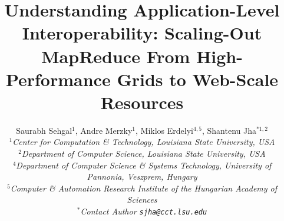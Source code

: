 \documentclass[3p,twocolumn]{elsarticle}
\begin{document}
\title{Understanding Application-Level Interoperability: Scaling-Out
  MapReduce From High-Performance Grids to Web-Scale Resources}

     \author{Saurabh Sehgal$^1$, Andre Merzky$^{1}$, Miklos
       Erdelyi$^{4,5}$, Shantenu Jha$^{*1,2}$
       \\
       \small{\emph{$^{1}$Center for Computation \& Technology, Louisiana State University, USA}}\\
       \small{\emph{$^{2}$Department of Computer Science, Louisiana State University, USA}}\\
       \small{\emph{$^{4}$Department of Computer Science \& Systems
           Technology, University of
           Pannonia, Veszprem, Hungary}}\\
       \small{\emph{$^{5}$Computer \& Automation Research Institute of
           the Hungarian Academy of
           Sciences}}\\
       \small{\emph{$^{*}$Contact Author \texttt{sjha@cct.lsu.edu}}} }

\newif\ifdraft
\drafttrue
\ifdraft
 \newcommand{\amnote}[1]{     {\textcolor{magenta} { ***AM: #1 }}}
 \newcommand{\jhanote}[1]{    {\textcolor{red}     { ***SJ: #1 }}}
 \newcommand{\miklosnote}[1]{ {\textcolor{blue}    { ***ME: #1 }}}
 \newcommand{\ssnote}[1]{     {\textcolor{blue}    { ***SS: #1 }}}
\else
 \newcommand{\amnote}[1]{}
 \newcommand{\jhanote}[1]{}
 \newcommand{\miklosnote}[1]{}
 \newcommand{\ssnote}[1]{}
\fi

\newcommand{\sagamapreduce}{SAGA-MapReduce\xspace}
\newcommand{\smr}{\sagamapreduce}
\newcommand{\mr}{MapReduce\xspace}
\newcommand{\tc}{$T_c$\xspace}
\newcommand{\wc}{wordcount\xspace}
\newcommand{\Wc}{Wordcount\xspace}

\newcommand{\uppp}{\vspace*{-1em}}
\newcommand{\upp}{\vspace*{-0.66em}}
\newcommand{\up}{\vspace*{-0.33em}}
\newcommand{\shift}{\hspace*{1.00em}}

\newcommand{\T}[1]{\texttt{#1}}
\newcommand{\I}[1]{\textit{#1}}
\newcommand{\B}[1]{\textbf{#1}}
\newcommand{\F}[1]{\B{[FIXME: #1]}}
\newcommand{\TODO}[1]{\textcolor{red}{\B{TODO: #1}}}

\newcommand{\ssh}[1]{\T{ssh}\xspace}
\newcommand{\scp}[1]{\T{scp}\xspace}
\newcommand{\sshfs}[1]{\T{sshfs}\xspace}
 
\end{document}
